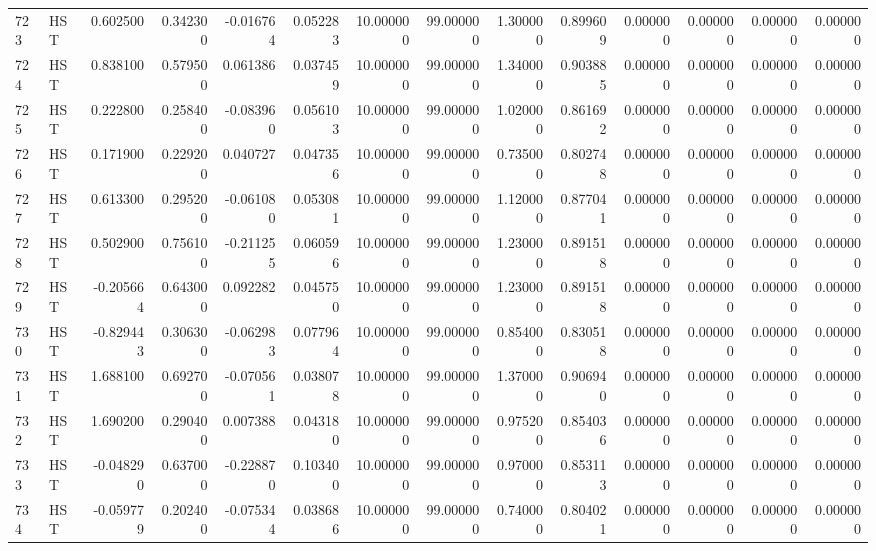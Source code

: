 \begin{tabular}{llrrrrrrrrrrrr}
723 &    HST &  0.602500 &      0.342300 & -0.016764 &    0.052283 &  10.000000 &     99.000000 &   1.300000 &  0.899609 &  0.000000 &   0.000000 &     0.000000 &     0.000000 \\
724 &    HST &  0.838100 &      0.579500 &  0.061386 &    0.037459 &  10.000000 &     99.000000 &   1.340000 &  0.903885 &  0.000000 &   0.000000 &     0.000000 &     0.000000 \\
725 &    HST &  0.222800 &      0.258400 & -0.083960 &    0.056103 &  10.000000 &     99.000000 &   1.020000 &  0.861692 &  0.000000 &   0.000000 &     0.000000 &     0.000000 \\
726 &    HST &  0.171900 &      0.229200 &  0.040727 &    0.047356 &  10.000000 &     99.000000 &   0.735000 &  0.802748 &  0.000000 &   0.000000 &     0.000000 &     0.000000 \\
727 &    HST &  0.613300 &      0.295200 & -0.061080 &    0.053081 &  10.000000 &     99.000000 &   1.120000 &  0.877041 &  0.000000 &   0.000000 &     0.000000 &     0.000000 \\
728 &    HST &  0.502900 &      0.756100 & -0.211255 &    0.060596 &  10.000000 &     99.000000 &   1.230000 &  0.891518 &  0.000000 &   0.000000 &     0.000000 &     0.000000 \\
729 &    HST & -0.205664 &      0.643000 &  0.092282 &    0.045750 &  10.000000 &     99.000000 &   1.230000 &  0.891518 &  0.000000 &   0.000000 &     0.000000 &     0.000000 \\
730 &    HST & -0.829443 &      0.306300 & -0.062983 &    0.077964 &  10.000000 &     99.000000 &   0.854000 &  0.830518 &  0.000000 &   0.000000 &     0.000000 &     0.000000 \\
731 &    HST &  1.688100 &      0.692700 & -0.070561 &    0.038078 &  10.000000 &     99.000000 &   1.370000 &  0.906940 &  0.000000 &   0.000000 &     0.000000 &     0.000000 \\
732 &    HST &  1.690200 &      0.290400 &  0.007388 &    0.043180 &  10.000000 &     99.000000 &   0.975200 &  0.854036 &  0.000000 &   0.000000 &     0.000000 &     0.000000 \\
733 &    HST & -0.048290 &      0.637000 & -0.228870 &    0.103400 &  10.000000 &     99.000000 &   0.970000 &  0.853113 &  0.000000 &   0.000000 &     0.000000 &     0.000000 \\
734 &    HST & -0.059779 &      0.202400 & -0.075344 &    0.038686 &  10.000000 &     99.000000 &   0.740000 &  0.804021 &  0.000000 &   0.000000 &     0.000000 &     0.000000 \\

\end{tabular}
